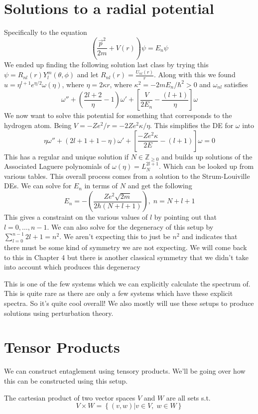\section{Solutions to a radial potential}
Specifically to the equation
$$
    \left(\frac{\vec{p}^2}{2m} + V(r)\right) \psi = E_n \psi
$$
We ended up finding the following solution last class by trying this \newline
$\psi = R_{nl}(r) Y^{m}_{l}\left(\theta, \phi\right)$ and let
$R_{nl}(r) = \frac{U_{nl}(r)}{r}$. Along with this we found
$u = \eta^{l+1} e^{\eta/2} \omega(\eta)$, where
$\eta = 2 \kappa r$, where $\kappa^2 = -2mE_n / \hbar^2 > 0$
and $\omega_{nl}$ satisfies
$$
    \omega'' + \left(\frac{2l+2}{\eta} - 1\right) \omega' +
    \left[\frac{V}{2E_n} - \frac{\left(l+1\right)}{\eta}\right] \omega
$$
We now want to solve this potential for something that corresponds
to the hydrogen atom. Being $V = -Ze^2 / r = -2 Z e^2 \kappa / \eta$.
This simplifies the DE for $\omega$ into
$$
    \eta \omega'' + \left(2l+1 + 1 -\eta\right) \omega' +
    \left[\frac{-Z e^2 \kappa}{2E} - (l+1)\right] \omega =0
$$
This has a regular and unique solution if $N \in \mathbb{Z}_{\ge 0}$ and
builds up solutions of the Associated Laguere polynomials of
$\omega(\eta) = L_{N}^{2l+1}$. Which can be looked up from various tables.
This overall process comes from a solution to the Strum-Louiville DEs.
We can solve for $E_n$ in terms of $N$ and get the following
$$
    E_n = - \left(\frac{Z e^2 \sqrt{2m}}{2\hbar \left(N + l + 1\right)}\right),
    \; n = N + l + 1
$$
This gives a constraint on the various values of $l$ by pointing out that
$l = 0, \dots, n - 1$. We can also solve for the degeneracy of this setup
by $\sum_{l=0}^{n-1} 2l + 1 = n^2$. We aren't expecting this to just be
$n^2$ and indicates that there must be some kind of symmetry we are not
expecting. We will come back to this in Chapter 4 but there is another
classical symmetry that we didn't take into account which produces this
degeneracy

This is one of the few systems which we can explicitly calculate the spectrum of.
This is quite rare as there are only a few systems which have these explicit spectra.
So it's quite cool overall! We also mostly will use these setups
to produce solutions using perturbation theory.

\section{Tensor Products}
We can construct entaglement using tensory products. We'll be going over how this
can be constructed using this setup. 
\begin{definition}
\label{cartProd}
The cartesian product of two vector spaces $V$ and $W$ are all sets s.t.
$$
    V \times W = \left\{(v, w) | v \in V,\; w\in W\right\}
$$
\end{definition}

